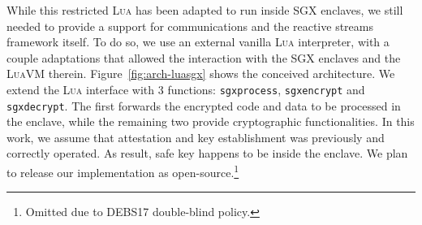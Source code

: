 While this restricted \textsc{Lua} has been adapted to run inside SGX enclaves, we still needed to provide a support for communications and the reactive streams framework itself.
To do so, we use an external vanilla \textsc{Lua} interpreter, with a couple adaptations that allowed the interaction with the SGX enclaves and the \textsc{LuaVM} therein.
Figure~\ref{fig:arch-luasgx} shows the conceived architecture.
We extend the \textsc{Lua} interface with 3 functions: \texttt{sgxprocess}, \texttt{sgxencrypt} and \texttt{sgxdecrypt}. 
The first forwards the encrypted code and data to be processed in the enclave, while the remaining two provide cryptographic functionalities.
In this work, we assume that attestation and key establishment was previously and correctly operated.
As result, safe key happens to be inside the enclave.
We plan to release our implementation as open-source.\footnote{Omitted due to DEBS17 double-blind policy.}
